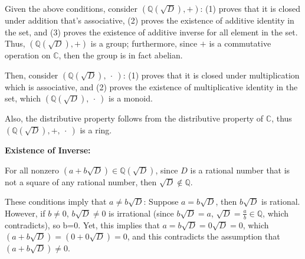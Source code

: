 \documentclass{article}
\begin{document}
\begin{itemize}
    \begin{comment}
    \item[(4)] For all $a,b,c,d,e,f\in\mathbb{R}$, the following equations about distributive property is true:
    $$((a+b\sqrt{D})+(c+d\sqrt{D}))(e+f\sqrt{D}) = ((a+c)+(b+d)\sqrt{D})(e+f\sqrt{D})$$
    $$ = (a+c)e+(a+c)f\sqrt{D} + (b+d)e\sqrt{D}+(b+d)f(\sqrt{D})^2$$
    $$ = ae+ce+af\sqrt{D}+cf\sqrt{D}+be\sqrt{D}+de\sqrt{D}+bfD+dfD$$
    $$ = ((ae+bfD) + (be\sqrt{D}+af\sqrt{D}))+((ce+dfD)+(de\sqrt{D}+cf\sqrt{D})$$
    $$ = (a+b\sqrt{D})(e+f\sqrt{D})+(c+d\sqrt{D})(e+f\sqrt{D})$$
    Which, multiplying $(e+f\sqrt{D})$ from the right side satisfies the distributive property.
    Also, since $\mathbb{C}$ is commutative under multiplication, then multiplying $(e+f\sqrt{D})$ from the left also satisfies the distributive property.
    \end{comment}
\end{itemize}

Given the above conditions, consider $(\mathbb{Q}(\sqrt{D}),+)$: (1) proves that it is closed under addition that's associative,
(2) proves the existence of additive identity in the set, and (3) proves the existence of additive inverse for all element in the set.
Thus, $(\mathbb{Q}(\sqrt{D}),+)$ is a group; furthermore, since $+$ is a commutative operation on $\mathbb{C}$, then the group is in fact abelian.

Then, consider $(\mathbb{Q}(\sqrt{D}),\ \cdot\ )$: (1) proves that it is closed under multiplication which is associative, 
and (2) proves the existence of multiplicative identity in the set, which $(\mathbb{Q}(\sqrt{D}),\ \cdot\ )$ is a monoid.

Also, the distributive property follows from the distributive property of $\mathbb{C}$, thus $(\mathbb{Q}(\sqrt{D}),+,\ \cdot\ )$ is a ring.

\hfill

\textbf{Existence of Inverse:}

For all nonzero $(a+b\sqrt{D})\in\mathbb{Q}(\sqrt{D})$,
since $D$ is a rational number that is not a square of any rational number, then $\sqrt{D}\notin \mathbb{Q}$.

These conditions imply that $a\neq b\sqrt{D}$: Suppose $a=b\sqrt{D}$, then $b\sqrt{D}$ is rational. However, if $b\neq 0$, $b\sqrt{D}\neq 0$ is irrational (since $b\sqrt{D}=a$, $\sqrt{D}=\frac{a}{b}\in\mathbb{Q}$, which contradicts), so b=0.
Yet, this implies that $a=b\sqrt{D}=0\sqrt{D} = 0$, which $(a+b\sqrt{D}) = (0+0\sqrt{D}) = 0$, and this contradicts the assumption that $(a+b\sqrt{D})\neq 0$.
\end{document}
